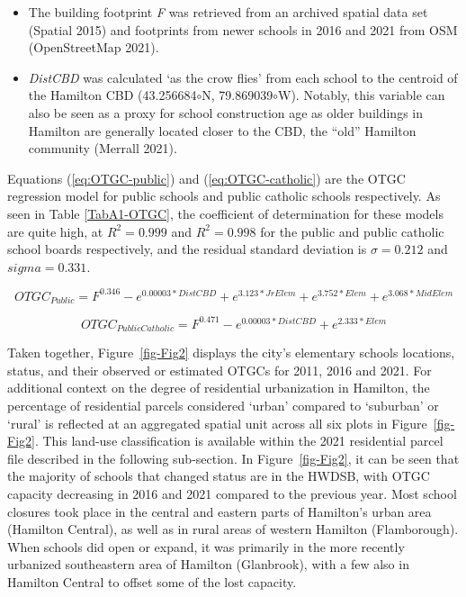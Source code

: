 \documentclass[
default
]{sn-jnl}
\begin{document}
\begin{itemize}
\item
  The building footprint \emph{F} was retrieved from an archived spatial
  data set (Spatial 2015) and footprints from newer schools in 2016 and
  2021 from OSM (OpenStreetMap 2021).
\item
  \emph{DistCBD} was calculated `as the crow flies' from each school to
  the centroid of the Hamilton CBD (43.256684\(\circ\)N,
  79.869039\(\circ\)W). Notably, this variable can also be seen as a
  proxy for school construction age as older buildings in Hamilton are
  generally located closer to the CBD, the ``old'' Hamilton community
  (Merrall 2021).
\end{itemize}

Equations (\ref{eq:OTGC-public}) and (\ref{eq:OTGC-catholic}) are the
OTGC regression model for public schools and public catholic schools
respectively. As seen in Table \ref{TabA1-OTGC}, the coefficient of
determination for these models are quite high, at \(R^2 = 0.999\) and
\(R^2 = 0.998\) for the public and public catholic school boards
respectively, and the residual standard deviation is \(\sigma = 0.212\)
and \(sigma = 0.331\).

\begin{equation}
\label{eq:OTGC-public}
OTGC_{Public} = F^{0.346}-e^{0.00003*DistCBD}+e^{3.123*JrElem}+e^{3.752*Elem}+ e^{3.068*MidElem} 
\end{equation}

\begin{equation}
\label{eq:OTGC-catholic}
OTGC_{Public Catholic} =F^{0.471}-e^{0.00003*DistCBD}+e^{2.333*Elem}
\end{equation}



Taken together, Figure~\ref{fig-Fig2} displays the city's elementary
schools locations, status, and their observed or estimated OTGCs for
2011, 2016 and 2021. For additional context on the degree of residential
urbanization in Hamilton, the percentage of residential parcels
considered `urban' compared to `suburban' or `rural' is reflected at an
aggregated spatial unit across all six plots in Figure~\ref{fig-Fig2}.
This land-use classification is available within the 2021 residential
parcel file described in the following sub-section. In
Figure~\ref{fig-Fig2}, it can be seen that the majority of schools that
changed status are in the HWDSB, with OTGC capacity decreasing in 2016
and 2021 compared to the previous year. Most school closures took place
in the central and eastern parts of Hamilton's urban area (Hamilton
Central), as well as in rural areas of western Hamilton (Flamborough).
When schools did open or expand, it was primarily in the more recently
urbanized southeastern area of Hamilton (Glanbrook), with a few also in
Hamilton Central to offset some of the lost capacity.
\end{document}
